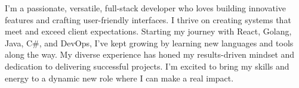 I'm a passionate, versatile, full-stack developer who loves building innovative features and crafting user-friendly interfaces. I thrive on creating systems that meet and exceed client expectations. Starting my journey with React, Golang, Java, C#, and DevOps, I've kept growing by learning new languages and tools along the way. My diverse experience has honed my results-driven mindset and dedication to delivering successful projects. I'm excited to bring my skills and energy to a dynamic new role where I can make a real impact.